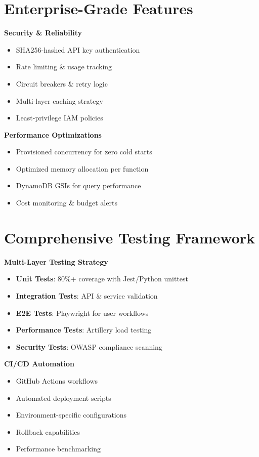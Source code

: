 \documentclass[11pt,letterpaper]{article}
\begin{document}
\begin{multicols}{2}
\section*{Enterprise-Grade Features}

\textbf{Security \& Reliability}
\begin{itemize}[itemsep=1pt]
\item SHA256-hashed API key authentication
\item Rate limiting \& usage tracking
\item Circuit breakers \& retry logic
\item Multi-layer caching strategy
\item Least-privilege IAM policies
\end{itemize}

\textbf{Performance Optimizations}
\begin{itemize}[itemsep=1pt]
\item Provisioned concurrency for zero cold starts
\item Optimized memory allocation per function
\item DynamoDB GSIs for query performance
\item Cost monitoring \& budget alerts
\end{itemize}

\columnbreak

\section*{Comprehensive Testing Framework}

\textbf{Multi-Layer Testing Strategy}
\begin{itemize}[itemsep=1pt]
\item \textbf{Unit Tests}: 80\%+ coverage with Jest/Python unittest
\item \textbf{Integration Tests}: API \& service validation
\item \textbf{E2E Tests}: Playwright for user workflows
\item \textbf{Performance Tests}: Artillery load testing
\item \textbf{Security Tests}: OWASP compliance scanning
\end{itemize}

\textbf{CI/CD Automation}
\begin{itemize}[itemsep=1pt]
\item GitHub Actions workflows
\item Automated deployment scripts
\item Environment-specific configurations
\item Rollback capabilities
\item Performance benchmarking
\end{itemize}


\end{multicols}
\end{document}
